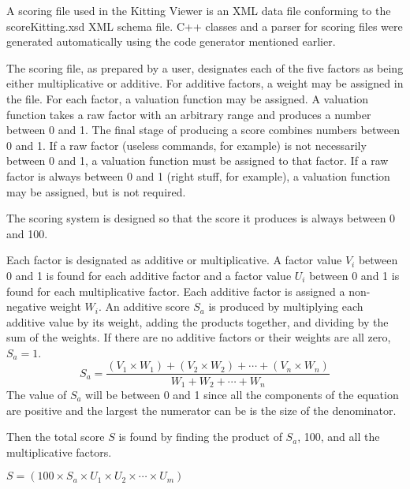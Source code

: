 A scoring file used in the Kitting Viewer is an XML data file conforming to
the scoreKitting.xsd XML schema file. C++ classes and a parser for scoring
files were generated automatically using the code generator mentioned
earlier.

The scoring file, as prepared by a user, designates each of the five
factors as being either multiplicative or additive. For additive factors, a
weight may be assigned in the file. For each factor, a valuation function
may be assigned. A valuation function takes a raw factor with an arbitrary
range and produces a number between 0 and 1. The final stage of producing
a score combines numbers between 0 and 1. If a raw factor (useless
commands, for example) is not necessarily between 0 and 1, a valuation
function must be assigned to that factor. If a raw factor is always between
0 and 1 (right stuff, for example), a valuation function may be assigned,
but is not required.

The scoring system is designed so that the score it produces is always
between 0 and 100.

Each factor is designated as additive or multiplicative. A factor
value $V_i$ between 0 and 1 is found for each additive factor and a
factor value $U_i$ between 0 and 1 is found for each multiplicative
factor. Each additive factor is assigned a non-negative weight $W_i$. An
additive score $S_a$ is produced by multiplying each additive value by
its weight, adding the products together, and dividing by the sum of the
weights. If there are no additive factors or their weights are all
zero, $S_a = 1$.
\[
S_a = \frac{(V_1\times W_1)+(V_2\times W_2)+\cdots + (V_n\times W_n)}{W_1+W_2+\cdots+W_n}
\]
The value of $S_a$ will be between 0 and 1 since all the components of the
equation are positive and the largest the numerator can be is the size
of the denominator.

Then the total score $S$ is found by finding the product of $S_a$, 100, and
all the multiplicative factors.

$S = (100\times S_a\times U_1\times U_2\times\cdots \times U_m)$




